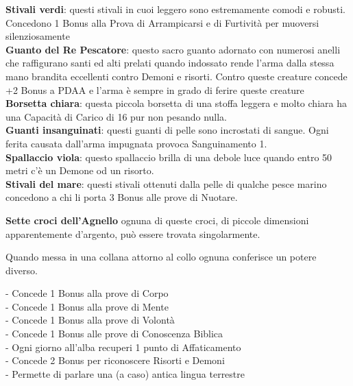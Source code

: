 \documentclass[12pt,a4paper,twoside,openany]{book}
\begin{document}
\begin{multicols}{2}
\textbf{Stivali verdi}: questi stivali in cuoi leggero sono estremamente comodi e robusti. Concedono 1 Bonus alla Prova di Arrampicarsi e di Furtività per muoversi silenziosamente\\

\textbf{Guanto del Re Pescatore}: questo sacro guanto adornato con numerosi anelli che raffigurano santi ed alti prelati quando indossato rende l'arma dalla stessa mano brandita eccellenti contro Demoni e risorti. Contro queste creature concede +2 Bonus a PDAA e l'arma è sempre in grado di ferire queste creature\\

\textbf{Borsetta chiara}: questa piccola borsetta di una stoffa leggera e molto chiara ha una Capacità di Carico di 16 pur non pesando nulla.\\

\textbf{Guanti insanguinati}: questi guanti di pelle sono incrostati di sangue. Ogni ferita causata dall'arma impugnata provoca Sanguinamento 1.\\

\textbf{Spallaccio viola}: questo spallaccio brilla di una debole luce quando entro 50 metri c'è un Demone od un risorto.\\

\textbf{Stivali del mare}: questi stivali ottenuti dalla pelle di qualche pesce marino concedono a chi li porta 3 Bonus alle prove di Nuotare.


\textbf{Sette croci dell'Agnello} ognuna di queste croci, di piccole dimensioni apparentemente d'argento, può essere trovata singolarmente.

Quando messa in una collana attorno al collo ognuna conferisce un potere diverso.

- Concede 1 Bonus alla prove di Corpo\\
- Concede 1 Bonus alla prove di Mente\\
- Concede 1 Bonus alla prove di Volontà\\
- Concede 1 Bonus alle prove di Conoscenza Biblica\\
- Ogni giorno all'alba recuperi 1 punto di Affaticamento\\
- Concede 2 Bonus per riconoscere Risorti e Demoni\\
- Permette di parlare una (a caso) antica lingua terrestre\\


\end{multicols}
\end{document}

